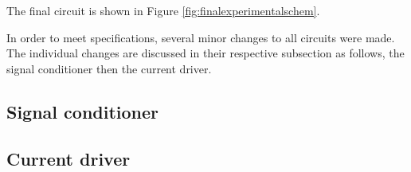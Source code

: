 
The final circuit is shown in Figure \ref{fig:finalexperimentalschem}.


In order to meet specifications, several minor changes to all circuits were made. The individual changes are discussed in their respective subsection as follows, the signal conditioner then the current driver.


%


\subsection{Signal conditioner}
%

\subsection{Current driver}
%
	
